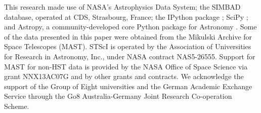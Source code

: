 \documentclass[a4paper,fleqn,usenatbib]{mnras}
\begin{document}
This research made use of NASA's Astrophysics Data System; the SIMBAD database, operated at CDS, Strasbourg, France; the IPython package \citep{PER-GRA:2007}; SciPy \citep{jones_scipy_2001}; and Astropy, a community-developed core Python package for Astronomy \citep{astropy}. Some of the data presented in this paper were obtained from the Mikulski Archive for Space Telescopes (MAST). STScI is operated by the Association of Universities for Research in Astronomy, Inc., under NASA contract NAS5-26555. Support for MAST for non-HST data is provided by the NASA Office of Space Science via grant NNX13AC07G and by other grants and contracts. We acknowledge the support of the Group of Eight universities and the German Academic Exchange Service through the Go8 Australia-Germany Joint Research Co-operation Scheme. 















\bsp	%
\label{lastpage}
\end{document}

